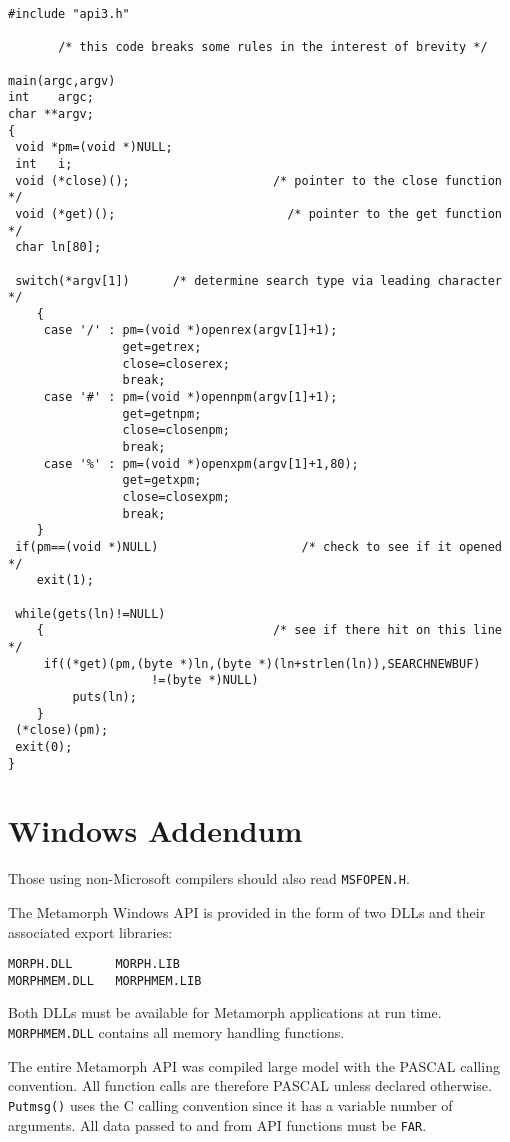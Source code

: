 \EXAMPLE
\begin{verbatim}
#include "api3.h"

       /* this code breaks some rules in the interest of brevity */

main(argc,argv)
int    argc;
char **argv;
{
 void *pm=(void *)NULL;
 int   i;
 void (*close)();                    /* pointer to the close function */
 void (*get)();                        /* pointer to the get function */
 char ln[80];

 switch(*argv[1])      /* determine search type via leading character */
    {
     case '/' : pm=(void *)openrex(argv[1]+1);
                get=getrex;
                close=closerex;
                break;
     case '#' : pm=(void *)opennpm(argv[1]+1);
                get=getnpm;
                close=closenpm;
                break;
     case '%' : pm=(void *)openxpm(argv[1]+1,80);
                get=getxpm;
                close=closexpm;
                break;
    }
 if(pm==(void *)NULL)                    /* check to see if it opened */
    exit(1);

 while(gets(ln)!=NULL)
    {                                /* see if there hit on this line */
     if((*get)(pm,(byte *)ln,(byte *)(ln+strlen(ln)),SEARCHNEWBUF)
                    !=(byte *)NULL)
         puts(ln);
    }
 (*close)(pm);
 exit(0);
}
\end{verbatim}

\chapter {Windows Addendum}

Those using non-Microsoft compilers should also read \verb`MSFOPEN.H`.

The Metamorph Windows API is provided in the form of two DLLs and
their associated export libraries:

\begin{verbatim}
MORPH.DLL      MORPH.LIB
MORPHMEM.DLL   MORPHMEM.LIB
\end{verbatim}

Both DLLs must be available for Metamorph applications at run
time.  \verb`MORPHMEM.DLL` contains all memory handling functions.

The entire Metamorph API was compiled large model with the PASCAL
calling convention.  All function calls are therefore PASCAL
unless declared otherwise.  \verb`Putmsg()` uses the C calling convention
since it has a variable number of arguments.  All data passed to
and from API functions must be \verb`FAR`.


